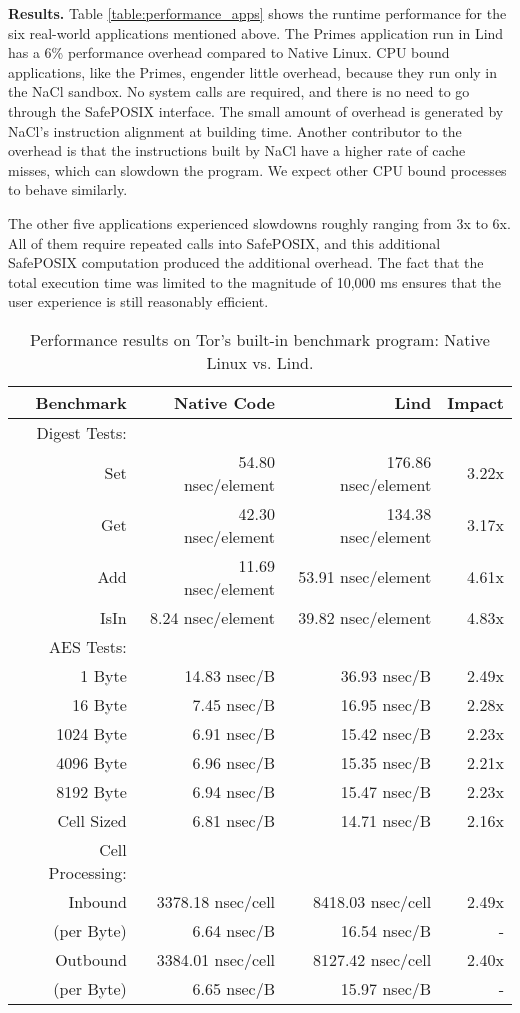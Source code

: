 {{{\noindent
\textbf{Results.}
Table \ref{table:performance_apps} shows the runtime performance
for the six real-world applications mentioned above.
The Primes application run in Lind has a 6\% performance overhead compared to
Native Linux. CPU bound applications, like the Primes, engender little overhead,
because they run only in the NaCl sandbox. No system calls are
required, and there is no need to go through the SafePOSIX interface. The small
 amount of overhead is generated by NaCl's instruction alignment at building time.
  Another contributor to the overhead is that the instructions built by NaCl
  have a higher rate of cache misses, which can slowdown the
program. We expect other CPU bound processes to behave similarly.

The other five applications experienced slowdowns roughly ranging from 3x to 6x.
All of them require repeated calls into SafePOSIX, and this additional SafePOSIX
computation produced the additional overhead. 
The fact that the total execution time was limited 
to the magnitude of 10,000 ms ensures that the 
user experience is still reasonably efficient.

\begin{table}
\centering
\scriptsize
\begin{tabular}{|r|r|r|r|}
  \hline
  {\bf Benchmark} & {\bf Native Code} & {\bf Lind} & {\bf Impact}  \\
  \hline
  Digest Tests: & & & \\
  Set & 54.80 nsec/element & 176.86 nsec/element & 3.22x \\
  Get & 42.30 nsec/element & 134.38 nsec/element & 3.17x \\
  Add & 11.69 nsec/element & 53.91 nsec/element & 4.61x \\
  IsIn & 8.24 nsec/element & 39.82 nsec/element & 4.83x \\
  \hline
  AES Tests: & & & \\
  1 Byte & 14.83 nsec/B & 36.93 nsec/B & 2.49x \\
  16 Byte & 7.45 nsec/B & 16.95 nsec/B & 2.28x \\
  1024 Byte & 6.91 nsec/B & 15.42 nsec/B & 2.23x \\
  4096 Byte & 6.96 nsec/B & 15.35 nsec/B & 2.21x \\
  8192 Byte & 6.94 nsec/B & 15.47 nsec/B & 2.23x \\
  Cell Sized & 6.81 nsec/B & 14.71 nsec/B & 2.16x \\
  \hline
  Cell Processing: & & & \\
  Inbound & 3378.18 nsec/cell & 8418.03 nsec/cell & 2.49x \\
  (per Byte) & 6.64 nsec/B & 16.54 nsec/B & - \\
  Outbound & 3384.01 nsec/cell & 8127.42 nsec/cell & 2.40x \\
  (per Byte) & 6.65 nsec/B & 15.97 nsec/B & - \\
  \hline
\end{tabular}
\caption{\small Performance results on Tor's built-in benchmark program: Native
Linux vs. Lind.}
\label{table:performance_tor}
\end{table}

}}}
